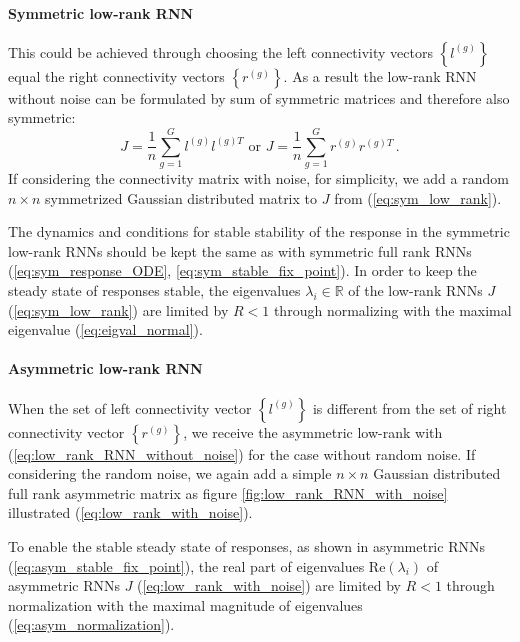 \documentclass[11pt]{article}
\begin{document}
	\paragraph{Symmetric low-rank RNN}This could be achieved through choosing the left connectivity vectors $\left\{l^{(g)}\right\}$ equal the right connectivity vectors $\left\{r^{(g)}\right\}$. As a result the low-rank RNN without noise can be formulated by sum of symmetric matrices and therefore also symmetric:
		\begin{equation} \label{eq:sym_low_rank}
			J = \frac{1}{n}\sum_{g =1}^{G} l^{(g)} l^{(g)T} \, \, \text{or} \, \, J = \frac{1}{n}\sum_{g =1}^{G} r^{(g)} r^{(g)T} \, .
		\end{equation}
	If considering the connectivity matrix with noise, for simplicity, we add a random $n \times n$ symmetrized Gaussian distributed matrix to $J$ from (\ref{eq:sym_low_rank}).
	
	The dynamics and conditions for stable stability of the response in the symmetric low-rank RNNs should be kept the same as with symmetric full rank RNNs (\ref{eq:sym_response_ODE}, \ref{eq:sym_stable_fix_point}). In order to keep the steady state of responses stable, the eigenvalues $\lambda_i \in \mathbb{R}$ of the low-rank RNNs $J$ (\ref{eq:sym_low_rank}) are limited by $R < 1$ through normalizing with the maximal eigenvalue (\ref{eq:eigval_normal}). 
	
	\paragraph{Asymmetric low-rank RNN} When the set of left connectivity vector  $\left\{l^{(g)}\right\}$ is different from the set of right connectivity vector $\left\{r^{(g)}\right\}$, we receive the asymmetric low-rank with (\ref{eq:low_rank_RNN_without_noise}) for the case without random noise. If considering the random noise, we again add a simple $n \times n$ Gaussian distributed full rank asymmetric matrix as figure \ref{fig:low_rank_RNN_with_noise} illustrated (\ref{eq:low_rank_with_noise}). 
	
	To enable the stable steady state of responses, as shown in asymmetric RNNs (\ref{eq:asym_stable_fix_point}), the real part of eigenvalues $\text{Re}(\lambda_i)$ of asymmetric RNNs $J$ (\ref{eq:low_rank_with_noise}) are limited by $R < 1$ through normalization with the maximal magnitude of eigenvalues (\ref{eq:asym_normalization}). 
	
\end{document}
